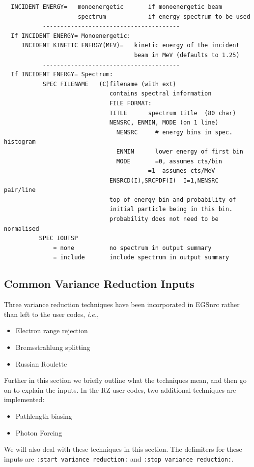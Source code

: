 \documentclass[12pt,twoside]{article}  %
\begin{document}
\begin{verbatim}
  INCIDENT ENERGY=   monoenergetic       if monoenergetic beam
                     spectrum            if energy spectrum to be used
           ---------------------------------------
  If INCIDENT ENERGY= Monoenergetic:
     INCIDENT KINETIC ENERGY(MEV)=   kinetic energy of the incident
                                     beam in MeV (defaults to 1.25)
           ---------------------------------------
  If INCIDENT ENERGY= Spectrum:
           SPEC FILENAME   (C)filename (with ext)
                              contains spectral information
                              FILE FORMAT:
                              TITLE      spectrum title  (80 char)
                              NENSRC, ENMIN, MODE (on 1 line)
                                NENSRC     # energy bins in spec. histogram
                                ENMIN      lower energy of first bin
                                MODE       =0, assumes cts/bin
                                         =1  assumes cts/MeV
                              ENSRCD(I),SRCPDF(I)  I=1,NENSRC pair/line
                              top of energy bin and probability of
                              initial particle being in this bin.
                              probability does not need to be normalised
          SPEC IOUTSP
              = none          no spectrum in output summary
              = include       include spectrum in output summary
\end{verbatim}

\subsection{Common Variance Reduction Inputs}
\label{varredsect}

Three variance reduction techniques have been incorporated in
EGSnrc rather than left to the user codes, {\em i.e.},
\begin{itemize}
\item{Electron range rejection}
\item{Bremsstrahlung splitting}
\item{Russian Roulette}
\end{itemize}
Further in this section we briefly outline what the techniques mean, and
then go on to explain the inputs.
In the RZ user codes, two additional techniques are implemented:
\begin{itemize}
\item{Pathlength biasing}
\item{Photon Forcing}
\end{itemize}
We will also deal with these techniques in this section.
The delimiters for these inputs are
\verb+:start variance reduction:+  and \verb+:stop variance reduction:+.
\end{document}
